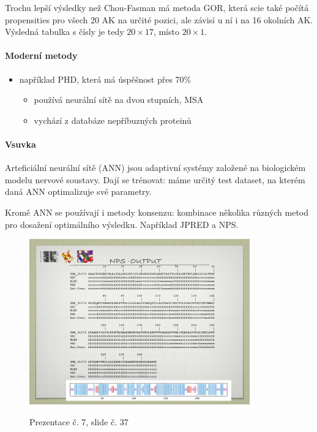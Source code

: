 \documentclass[DIV=8]{scrreprt}
\newcommand{\mybox}[2]{
    \paragraph{#1} #2
}
\begin{document}
Trochu lepší výsledky než Chou-Fasman má metoda GOR, která scie také počítá propensities pro všech 20 AK na určité pozici, ale závisí u ní i na 16 okolních AK. Výsledná tabulka s čísly je tedy \(20 \times 17\), místo \(20 \times 1\).

\paragraph{Moderní metody}
\begin{itemize}[nosep]
    \item například PHD, která má úspěšnost přes 70\%
\begin{itemize}[nosep]
    \item používá neurální sítě na dvou stupních, MSA
    \item vychází z databáze nepříbuzných proteinů
\end{itemize}

\end{itemize}



\mybox{Vsuvka}{Arteficiální neurální sítě (ANN) jsou adaptivní systémy založené na biologickém modelu nervové soustavy. Dají se trénovat: máme určitý test dataset, na kterém daná ANN optimalizuje své parametry.

Kromě ANN se používají i metody konsenzu: kombinace několika různých metod pro dosažení optimálního výsledku. Například JPRED a NPS. \begin{figure}
    \caption{Prezentace č. 7, slide č. 37}
    \includegraphics[width=0.85\textwidth]{slides-7/slide-37.jpg}
    \centering
    \label{slides-7-slide-37}
\end{figure}
}
\end{document}
